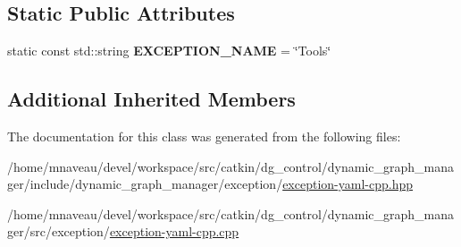 \subsection*{Static Public Attributes}
\begin{DoxyCompactItemize}
\item 
static const std\+::string {\bfseries E\+X\+C\+E\+P\+T\+I\+O\+N\+\_\+\+N\+A\+ME} = \char`\"{}Tools\char`\"{}\hypertarget{classdynamic__graph_1_1ExceptionYamlCpp_a7d19bc2c6d36d26bd878795ea00bc63f}{}\label{classdynamic__graph_1_1ExceptionYamlCpp_a7d19bc2c6d36d26bd878795ea00bc63f}

\end{DoxyCompactItemize}
\subsection*{Additional Inherited Members}


The documentation for this class was generated from the following files\+:\begin{DoxyCompactItemize}
\item 
/home/mnaveau/devel/workspace/src/catkin/dg\+\_\+control/dynamic\+\_\+graph\+\_\+manager/include/dynamic\+\_\+graph\+\_\+manager/exception/\hyperlink{exception-yaml-cpp_8hpp}{exception-\/yaml-\/cpp.\+hpp}\item 
/home/mnaveau/devel/workspace/src/catkin/dg\+\_\+control/dynamic\+\_\+graph\+\_\+manager/src/exception/\hyperlink{exception-yaml-cpp_8cpp}{exception-\/yaml-\/cpp.\+cpp}\end{DoxyCompactItemize}
